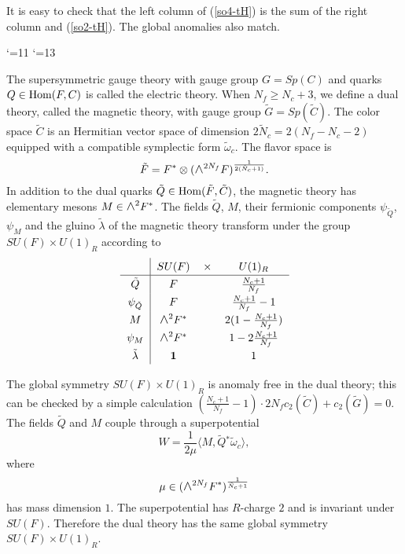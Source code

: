 \documentclass[lecture]{qft-l}
\newcommand{\lam}{\lambda}
\newcommand{\om}{\omega}
\newcommand{\medwedge}{\mbox{\fontsize{12pt}{0pt}\selectfont $\wedge$}}
\newcommand{\Hom}{{\rm Hom}}
\newcommand{\bra}{\langle}
\newcommand{\ket}{\rangle}
\newcommand{\inv}[1]{\frac{1}{#1}}
\newcommand{\one}{{\mathbf 1}}
\newcommand{\tC}{\tilde{C}{}}
\newcommand{\tF}{\tilde{F}{}}
\newcommand{\tQ}{\tilde{Q}{}}
\newcommand{\tN}{\tilde{N}_c}
\newcommand{\tom}{\tilde{\om}_c}
\begin{document}
\medskip\noindent
It is easy to check that the left column of (\ref{so4-tH}) is the sum of
the right column and (\ref{so2-tH}).
The global anomalies also match.

 

\catcode`\@=11
\catcode`\@=13


The supersymmetric gauge theory with gauge group $G=Sp(C)$ and
quarks $Q\in\Hom(F,C)$ is called the electric theory.
When $N_f\ge N_c+3$, we define a dual theory, called the magnetic theory,
with gauge group $\tilde{G}=Sp(\tC)$.
The color space $\tC$ is an Hermitian vector space of dimension
$2\tN=2(N_f-N_c-2)$ equipped with a compatible symplectic form $\tom$.
The flavor space is
	\begin{equation}
\tF=F^*\otimes(\medwedge^{2N_f}F)^{\inv{2(\tN+1)}}.
	\end{equation}
In addition to the dual quarks $\tQ\in\Hom(\tF,\tC)$, the magnetic theory has
elementary mesons $M\in\medwedge^2F^*$.
The fields $\tQ$, $M$, their fermionic components $\psi_{\tQ}$, $\psi_M$
and the gluino $\tilde{\lam}$ of the magnetic theory transform under
the group $SU(F)\times U(1)_R$ according to
	\begin{equation}\label{sp-transD}
	\renewcommand{\arraystretch}{1.3}
	\begin{tabular}{c|ccc}
& $SU(F)$	&$\times$   &	$U(1)_R$			\\
	\hline
$\tQ$	& $F$	&	&   $\frac{N_c+1}{N_f}$		\\
$\psi_{\tQ}$	& $F$		&&   $\frac{N_c+1}{N_f}-1$\\
$M$	  & $\medwedge^2F^*$	&&$2(1-\frac{N_c+1}{N_f})$	\\
$\psi_M$  & $\medwedge^2F^*$	&&$1-2\frac{N_c+1}{N_f}$	\\
$\tilde{\lam}$	& $\one$	&&   $1$
	\end{tabular}
	\end{equation}

\medskip\noindent
The global symmetry $SU(F)\times U(1)_R$ is anomaly free in the dual theory;
this can be checked by a simple calculation
$(\frac{N_c+1}{N_f}-1)\cdot 2N_fc_2(\tC)+c_2(\tilde{G})=0$.
The fields $\tQ$ and $M$ couple through a superpotential
	\begin{equation}\label{sp-WD}
W=\inv{2\mu}\bra M,\tQ^*\tom\ket,
	\end{equation}
where
	\begin{equation}\label{sp-mu}
\mu\in(\medwedge^{2N_f}F^*)^{\inv{\tN+1}}
	\end{equation}
has mass dimension $1$.
The superpotential has $R$-charge $2$ and is invariant under $SU(F)$.
Therefore the dual theory has the same global symmetry $SU(F)\times U(1)_R$.
\end{document}
